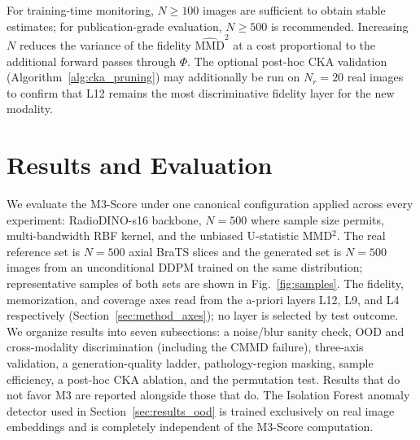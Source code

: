 \documentclass[lettersize,journal]{IEEEtran}
\begin{document}
For training-time monitoring, $N \geq 100$ images are sufficient to
obtain stable estimates; for publication-grade evaluation, $N \geq 500$
is recommended.
Increasing $N$ reduces the variance of the fidelity $\widehat{\mathrm{MMD}}^2$
at a cost proportional to the additional forward passes through $\Phi$.
The optional post-hoc CKA validation (Algorithm~\ref{alg:cka_pruning})
may additionally be run on $N_r = 20$ real images to
confirm that L12 remains the most discriminative fidelity layer for the
new modality.

\section{Results and Evaluation}
\label{sec:results}

We evaluate the M3-Score under one canonical configuration applied across
every experiment: RadioDINO-s16 backbone, $N = 500$ where sample size
permits, multi-bandwidth RBF kernel, and the unbiased U-statistic
MMD$^2$. The real reference set is $N = 500$ axial BraTS slices and the
generated set is $N = 500$ images from an unconditional DDPM trained on the
same distribution; representative samples of both sets are shown in
Fig.~\ref{fig:samples}. The fidelity, memorization, and coverage axes read from
the a-priori layers L12, L9, and L4 respectively
(Section~\ref{sec:method_axes}); no layer is selected by test outcome.
We organize results into seven subsections: a noise/blur sanity check, OOD
and cross-modality discrimination (including the CMMD failure), three-axis
validation, a generation-quality ladder, pathology-region masking, sample
efficiency, a post-hoc CKA ablation, and the permutation test. Results that
do not favor M3 are reported alongside those that do.
The Isolation Forest anomaly detector used in
Section~\ref{sec:results_ood} is trained exclusively on real image
embeddings and is completely independent of the M3-Score computation.
\end{document}

